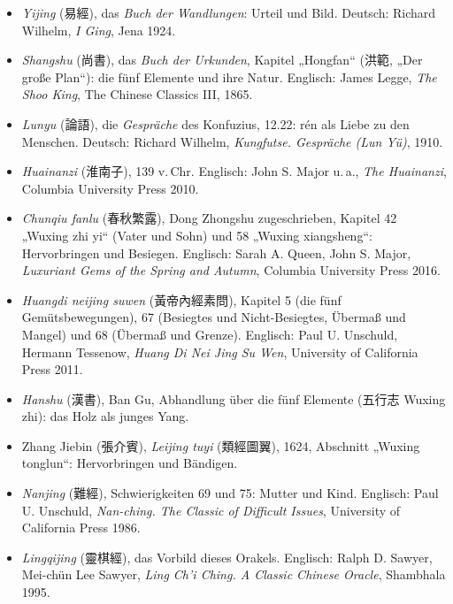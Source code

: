 \documentclass[12pt,paper=a5,DIV=13,headings=small,twoside=true,open=any]{scrbook}
\begin{document}
\begin{itemize}[leftmargin=*, itemsep=0pt]
  \item \textit{Yijing} ({\cjk 易經}), das \textit{Buch der Wandlungen}: Urteil und Bild. Deutsch: Richard Wilhelm, \textit{I Ging}, Jena 1924.
  \item \textit{Shangshu} ({\cjk 尚書}), das \textit{Buch der Urkunden}, Kapitel „Hongfan“ ({\cjk 洪範}, „Der große Plan“): die fünf Elemente und ihre Natur. Englisch: James Legge, \textit{The Shoo King}, The Chinese Classics III, 1865.
  \item \textit{Lunyu} ({\cjk 論語}), die \textit{Gespräche} des Konfuzius, 12.22: rén als Liebe zu den Menschen. Deutsch: Richard Wilhelm, \textit{Kungfutse. Gespräche (Lun Yü)}, 1910.
  \item \textit{Huainanzi} ({\cjk 淮南子}), 139 v.\,Chr. Englisch: John S. Major u.\,a., \textit{The Huainanzi}, Columbia University Press 2010.
  \item \textit{Chunqiu fanlu} ({\cjk 春秋繁露}), Dong Zhongshu zugeschrieben, Kapitel 42 „Wuxing zhi yi“ (Vater und Sohn) und 58 „Wuxing xiangsheng“: Hervorbringen und Besiegen. Englisch: Sarah A. Queen, John S. Major, \textit{Luxuriant Gems of the Spring and Autumn}, Columbia University Press 2016.
  \item \textit{Huangdi neijing suwen} ({\cjk 黃帝內經素問}), Kapitel 5 (die fünf Gemütsbewegungen), 67 (Besiegtes und Nicht-Besiegtes, Übermaß und Mangel) und 68 (Übermaß und Grenze). Englisch: Paul U. Unschuld, Hermann Tessenow, \textit{Huang Di Nei Jing Su Wen}, University of California Press 2011.
  \item \textit{Hanshu} ({\cjk 漢書}), Ban Gu, Abhandlung über die fünf Elemente ({\cjk 五行志} Wuxing zhi): das Holz als junges Yang.
  \item Zhang Jiebin ({\cjk 張介賓}), \textit{Leijing tuyi} ({\cjk 類經圖翼}), 1624, Abschnitt „Wuxing tonglun“: Hervorbringen und Bändigen.
  \item \textit{Nanjing} ({\cjk 難經}), Schwierigkeiten 69 und 75: Mutter und Kind. Englisch: Paul U. Unschuld, \textit{Nan-ching. The Classic of Difficult Issues}, University of California Press 1986.
  \item \textit{Lingqijing} ({\cjk 靈棋經}), das Vorbild dieses Orakels. Englisch: Ralph D. Sawyer, Mei-chün Lee Sawyer, \textit{Ling Ch’i Ching. A Classic Chinese Oracle}, Shambhala 1995.
\end{itemize}

\enlargethispage{3\baselineskip}
\end{document}
